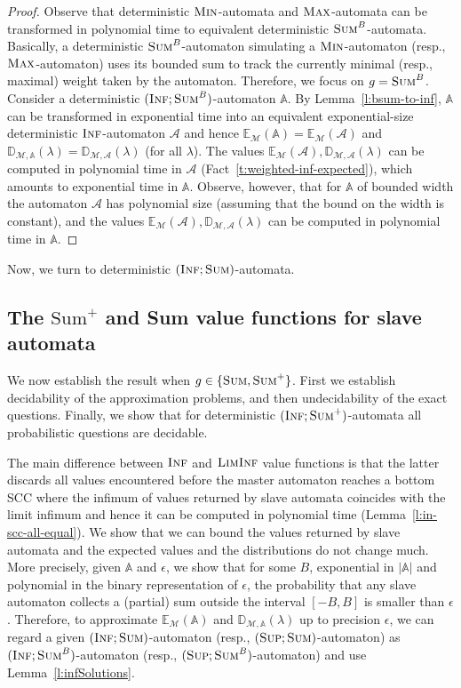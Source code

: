 \documentclass{lmcs}
\newcommand{\proofideas}{\smallskip\noindent{\emph{The key ideas.}}}
\newcommand{\nestedA}{\mathbb{A}}
\newcommand{\nonnestedA}{\mathcal{A}}
\newcommand{\fsum}{\textsc{Sum}}
\newcommand{\fBsum}[1]{\textsc{Sum}^{#1}}
\newcommand{\fmax}{\textsc{Max}}
\newcommand{\fmin}{\textsc{Min}}
\newcommand{\fliminf}{\textsc{LimInf}}
\newcommand{\fsup}{\textsc{Sup}}
\newcommand{\finf}{\textsc{Inf}}
\newcommand{\const}{\lambda}
\newcommand{\expected}{\mathbb{E}}
\newcommand{\distrib}{\mathbb{D}}
\newcommand{\markov}{\mathcal{M}}
\begin{document}
\begin{proof}
Observe that deterministic $\fmin$-automata and $\fmax$-automata can be
transformed in polynomial time to equivalent deterministic $\fBsum{B}$-automata.
Basically, a deterministic $\fBsum{B}$-automaton simulating a $\fmin$-automaton (resp., $\fmax$-automaton)
uses its bounded sum to track the currently minimal (resp., maximal) weight taken by the automaton.
Therefore, we focus on $g = \fBsum{B}$.
Consider a deterministic $(\finf;\fBsum{B})$-automaton $\nestedA$.
By Lemma~\ref{l:bsum-to-inf}, $\nestedA$ can be transformed in exponential time into an equivalent exponential-size deterministic $\finf$-automaton
$\nonnestedA$ and hence
$\expected_{\markov}(\nestedA) = \expected_{\markov}(\nonnestedA)$ and
$\distrib_{\markov,\nestedA}(\const) = \distrib_{\markov,\nonnestedA}(\const)$ (for all $\const$).
The values  $\expected_{\markov}(\nonnestedA), \distrib_{\markov,\nonnestedA}(\const)$ can be computed in polynomial time
in $\nonnestedA$ (Fact~\ref{t:weighted-inf-expected}), which amounts to exponential time in $\nestedA$.
Observe, however, that for $\nestedA$ of bounded width the automaton $\nonnestedA$ has polynomial size (assuming that the bound on the width is constant),
and the values  $\expected_{\markov}(\nonnestedA), \distrib_{\markov,\nonnestedA}(\const)$  can be computed in polynomial time in $\nestedA$.
\end{proof}


Now, we turn to deterministic $(\finf;\fsum)$-automata.


\subsection{The \texorpdfstring{$\text{Sum}^+$}{Sum+} and Sum value functions for slave automata}
We now establish the result when $g \in \{ \fsum,\fsum^+ \}$.
First we establish decidability of the approximation problems,
and then undecidability of the exact questions.
Finally, we show that for deterministic $(\finf; \fsum^+)$-automata all probabilistic questions are decidable.

\proofideas{}
The main difference between $\finf$ and $\fliminf$ value functions is that the latter discards all values encountered before the master automaton
reaches a bottom SCC where the infimum of values returned by slave automata coincides with the limit infimum and hence it can be computed in polynomial time (Lemma~\ref{l:in-scc-all-equal}).
We show that we can bound the values returned by slave automata and the expected values and the distributions do not change much.
More precisely, given $\nestedA$ and $\epsilon$, we show that for some $B$, exponential in $|\nestedA|$ and polynomial in the binary representation of $\epsilon$,
the probability that any slave automaton collects a (partial) sum outside the interval $[-B,B]$ is smaller than $\epsilon$.
Therefore, to approximate $\expected_{\markov}(\nestedA)$ and $\distrib_{\markov, \nestedA}(\const)$ up to precision $\epsilon$, we can regard a given
$(\finf; \fsum)$-automaton (resp., $(\fsup; \fsum)$-automaton) as
$(\finf; \fBsum{B})$-automaton (resp., $(\fsup; \fBsum{B})$-automaton) and use Lemma~\ref{l:infSolutions}.
\end{document}
